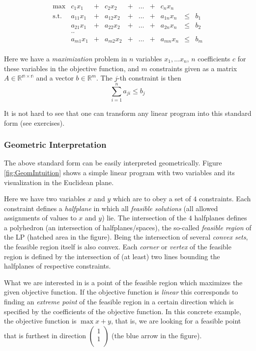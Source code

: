 \documentclass{article}
\begin{document}
\[
\begin{matrix}
	\max	& c_1 x_1 &+& c_2 x_2 &+& \dots &+& c_n x_n&&\\  
	\mbox{s.t.}	& a_{11} x_1 &+& a_{12} x_2&+& \dots &+&a_{1n} x_n&\leq&b_1\\
			& a_{21} x_1 &+& a_{22} x_2&+& \dots &+&a_{2n} x_n&\leq&b_2\\
			& ..	&&&&&&&&\\
			& a_{m1} x_1 &+& a_{m2} x_2&+& \dots &+&a_{mn} x_n&\leq&b_m\\
\end{matrix}
\]

Here we have a \emph{maximization} problem in $n$ variables $x_1, \dots x_n$, 
$n$ coefficients $c$ for these variables in the objective function, and $m$ constraints 
given as a matrix $A\in\mathbb{R^{m\times n}}$ and a vector $b\in\mathbb{R}^m$.
The $j$-th constraint is then 
\[
	\sum_{i=1}^n a_{ji}\leq b_j
\]

It is not hard to see that one can transform any linear program into this standard form
(see exercises).

\subsubsection{Geometric Interpretation}
The above standard form can be easily interpreted geometrically.
Figure \ref{fig:GeomIntuition} shows a simple linear program with two variables
and its visualization in the Euclidean plane. 

Here we have two  variables $x$ and $y$ which are to obey a set of $4$ constraints. 
Each constraint defines a \emph{halfplane} in which all \emph{feasible solutions}
(all allowed assignments of values to $x$ and $y$) lie. The intersection of the
$4$ halfplanes defines a polyhedron (an intersection of halfplanes/spaces),
the so-called \emph{feasible region} of the LP (hatched area in the figure). 
Being the intersection of several
\emph{convex sets}, the feasible region itself is also convex. Each \emph{corner} or \emph{vertex} of the feasible region is defined by the intersection of (at least) two lines bounding the halfplanes of respective constraints.

What we are interested in is a point of the feasible region which maximizes the given objective
function. If the objective function is \emph{linear} this corresponds to finding an \emph{extreme
point} of the feasible region in a certain direction which is specified by the coefficients
of the objective function. In this concrete example, the objective function is $\max x+y$, that
is, we are looking for a feasible point that is furthest in direction 
$\left( \begin{array}{c} 
1\\ 
1\\ 
\end{array}
\right)$ (the blue arrow in the figure). 
\end{document}

